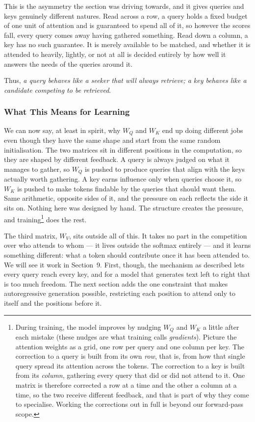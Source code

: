 \documentclass[11pt]{article}
\begin{document}
This is the asymmetry the section was driving towards, and it gives queries and keys genuinely different natures. Read across a row, a query holds a fixed budget of one unit of attention and is guaranteed to spend all of it, so however the scores fall, every query comes away having gathered something. Read down a column, a key has no such guarantee. It is merely available to be matched, and whether it is attended to heavily, lightly, or not at all is decided entirely by how well it answers the needs of the queries around it.

Thus, \emph{a query behaves like a seeker that will always retrieve; a key behaves like a candidate competing to be retrieved}.

\subsubsection*{What This Means for Learning}

We can now say, at least in spirit, why $W_Q$ and $W_K$ end up doing different jobs even though they have the same shape and start from the same random initialisation. The two matrices sit in different positions in the computation, so they are shaped by different feedback. A query is always judged on what it manages to gather, so $W_Q$ is pushed to produce queries that align with the keys actually worth gathering. A key earns influence only when queries choose it, so $W_K$ is pushed to make tokens findable by the queries that should want them. Same arithmetic, opposite sides of it, and the pressure on each reflects the side it sits on. Nothing here was designed by hand. The structure creates the pressure, and training\footnote{During training, the model improves by nudging $W_Q$ and $W_K$ a little after each mistake (these nudges are what training calls \emph{gradients}). Picture the attention weights as a grid, one row per query and one column per key. The correction to a query is built from its own \textit{row}, that is, from how that single query spread its attention across the tokens. The correction to a key is built from its \textit{column}, gathering every query that did or did not attend to it. One matrix is therefore corrected a row at a time and the other a column at a time, so the two receive different feedback, and that is part of why they come to specialise. Working the corrections out in full is beyond our forward-pass scope.} does the rest.

The third matrix, $W_V$, sits outside all of this. It takes no part in the competition over who attends to whom --- it lives outside the softmax entirely --- and it learns something different: what a token should contribute once it has been attended to. We will see it work in Section~9. First, though, the mechanism as described lets every query reach every key, and for a model that generates text left to right that is too much freedom. The next section adds the one constraint that makes autoregressive generation possible, restricting each position to attend only to itself and the positions before it.
\end{document}
